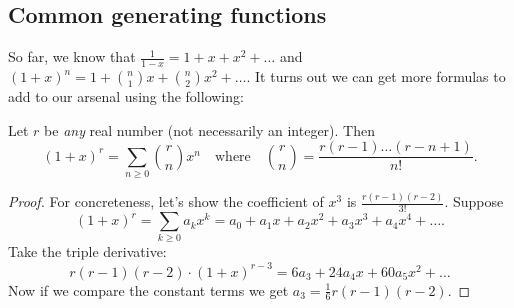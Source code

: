 \documentclass[11pt]{scrartcl}
\begin{document}
\subsection{Common generating functions}
So far, we know that $\frac{1}{1-x} = 1 + x + x^2 + \dots$
and $(1+x)^n = 1 + \binom n1 x + \binom n2 x^2 + \dots$.
It turns out we can get more formulas to add to our
arsenal using the following:
\begin{theorem}
	Let $r$ be \emph{any} real number (not necessarily an integer).
	Then
	\[ (1+x)^r = \sum_{n \ge 0} \binom{r}{n} x^n
		\quad\text{where}\quad
		\binom{r}{n}
		= \frac{r(r-1) \dots (r-n+1)}{n!}. \]
\end{theorem}
\begin{proof}
	For concreteness,
	let's show the coefficient of $x^3$ is $\frac{r(r-1)(r-2)}{3!}$.
	Suppose
	\[ (1+x)^r = \sum_{k \ge 0} a_k x^k
	= a_0 + a_1x + a_2x^2 + a_3x^3 + a_4x^4 +  \dots. \]
	Take the triple derivative:
	\[
		r(r-1)(r-2) \cdot (1+x)^{r-3}
		= 6a_3 + 24a_4x + 60a_5 x^2 + \dots
	\]
	Now if we compare the constant terms
	we get $a_3 = \frac16 r(r-1)(r-2)$.
\end{proof}
\end{document}
